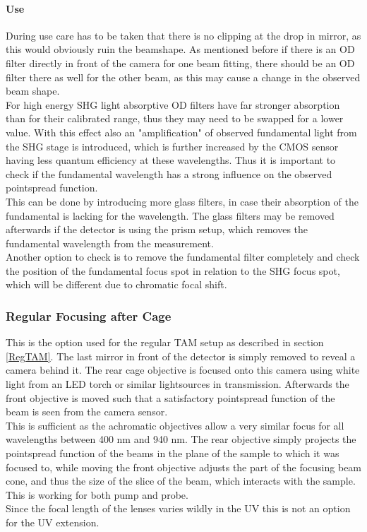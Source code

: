 \documentclass[twoside,openright]{scrreprt}
\begin{document}
\paragraph{Use}
During use care has to be taken that there is no clipping at the drop in mirror, as this would obviously ruin the beamshape. As mentioned before if there is an OD filter directly in front of the camera for one beam fitting, there should be an OD filter there as well for the other beam, as this may cause a change in the observed beam shape.\\
For high energy SHG light absorptive OD filters have far stronger absorption than for their calibrated range, thus they may need to be swapped for a lower value. With this effect also an "amplification" of observed fundamental light from the SHG stage is introduced, which is further increased by the CMOS sensor having less quantum efficiency at these wavelengths. Thus it is important to check if the fundamental wavelength has a strong influence on the observed pointspread function.\\
This can be done by introducing more glass filters, in case their absorption of the fundamental is lacking for the wavelength. The glass filters may be removed afterwards if the detector is using the prism setup, which removes the fundamental wavelength from the measurement.\\
Another option to check is to remove the fundamental filter completely and check the position of the fundamental focus spot in relation to the SHG focus spot, which will be different due to chromatic focal shift.

\subsubsection{Regular Focusing after Cage}\label{regRearFocus}
This is the option used for the regular TAM setup as described in section \ref{RegTAM}. The last mirror in front of the detector is simply removed to reveal a camera behind it. The rear cage objective is focused onto this camera using white light from an LED torch or similar lightsources in transmission. Afterwards the front objective is moved such that a satisfactory pointspread function of the beam is seen from the camera sensor.\\ 
This is sufficient as the achromatic objectives allow a very similar focus for all wavelengths between 400 nm and 940 nm. The rear objective simply projects the pointspread function of the beams in the plane of the sample to which it was focused to, while moving the front objective adjusts the part of the focusing beam cone, and thus the size of the slice of the beam, which interacts with the sample. This is working for both pump and probe.\\
Since the focal length of the lenses varies wildly in the UV this is not an option for the UV extension.
\end{document}
